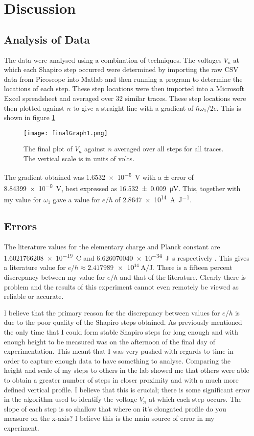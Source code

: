 \documentclass[11pt]{article}
\begin{document}
\section{Discussion}
\subsection{Analysis of Data}
The data were analysed using a combination of techniques. The voltages $V_n$ at which each Shapiro step occurred were determined by importing the raw CSV data from Picoscope into Matlab and then running a program to determine the locations of each step. These step locations were then imported into a Microsoft Excel spreadsheet and averaged over 32 similar traces. These step locations were then plotted against $n$ to give a straight line with a gradient of $\hbar\omega_1 / 2e$. This is shown in figure \ref{finalGraph1}
\begin{figure}[H]
	\centering
	\texttt{[image: finalGraph1.png]}
	\caption{The final plot of $V_n$ against $n$ averaged over all steps for all traces. The vertical scale is in units of volts.}
	\label{finalGraph1}
\end{figure}

The gradient obtained was \SI{1.6532e-5}{\volt} with a $\pm$ error of \SI{8.84399e-9}{\volt}, best expressed as \SI{16.532 \pm 0.009}{\micro\volt}. This, together with my value for $\omega_1$ gave a value for $e / h$ of \SI{2.8647e14}{\ampere\per\joule}.

\subsection{Errors}
The literature values for the elementary charge and Planck constant are \SI{1.6021766208e-19}{\coulomb} and \SI{6.626070040e-34}{\joule\second} respectively \cite{charge}\cite{planck}. This gives a literature value for $e/h \approx \SI{2.417989e14}{\ampere\per\joule}$. There is a fifteen percent discrepancy between my value for $e/h$ and that of the literature. Clearly there is problem and the results of this experiment cannot even remotely be viewed as reliable or accurate.

I believe that the primary reason for the discrepancy between values for $e/h$ is due to the poor quality of the Shapiro steps obtained. As previously mentioned the only time that I could form stable Shapiro steps for long enough and with enough height to be measured was on the afternoon of the final day of experimentation. This meant that I was very pushed with regards to time in order to capture enough data to have something to analyse. Comparing the height and scale of my steps to others in the lab showed me that others were able to obtain a greater number of steps in closer proximity and with a much more defined vertical profile. I believe that this is crucial; there is some significant error in the algorithm used to identify the voltage $V_n$ at which each step occurs. The slope of each step is so shallow that where on it's elongated profile do you measure on the x-axis? I believe this is the main source of error in my experiment.
\end{document}
